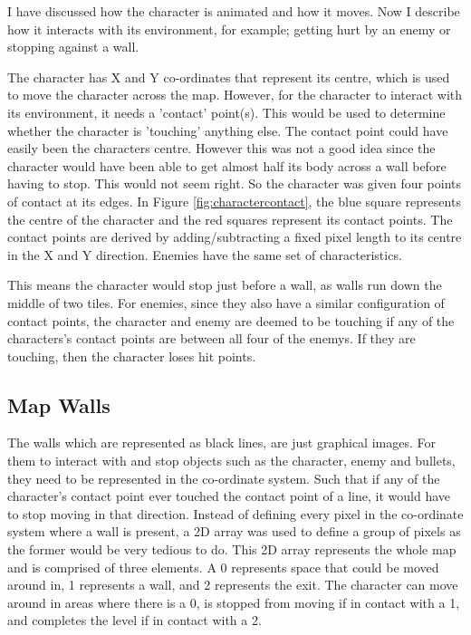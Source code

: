 \documentclass[a4paper,11.5pt]{report}
\numberwithin{figure}{section}
\numberwithin{table}{section}
\numberwithin{equation}{section}
\numberwithin{equation}{section}
\begin{document}
I have discussed how the character is animated and how it moves. Now I describe how it interacts with its environment, for example; getting hurt by an enemy or stopping against a wall.

The character has X and Y co-ordinates that represent its centre, which is used to move the character across the map. However, for the character to interact with its environment, it needs a 'contact' point(s). This would be used to determine whether the character is 'touching' anything else. The contact point could have easily been the characters centre. However this was not a good idea since the character would have been able to get almost half its body across a wall before having to stop. This would not seem right. So the character was given four points of contact at its edges. In Figure \ref{fig:charactercontact}, the blue square represents the centre of the character and the red squares represent its contact points. The contact points are derived by adding/subtracting a fixed pixel length to its centre in the X and Y direction. Enemies have the same set of characteristics.

This means the character would stop just before a wall, as walls run down the middle of two tiles. For enemies, since they also have a similar configuration of contact points, the character and enemy are deemed to be touching if any of the characters's contact points are between all four of the enemys. If they are touching, then the character loses hit points.


\subsection{Map Walls}

The walls which are represented as black lines, are just graphical images. For them to interact with and stop objects such as the character, enemy and bullets, they need to be represented in the co-ordinate system. Such that if any of the character's contact point ever touched the contact point of a line, it would have to stop moving in that direction. Instead of defining every pixel in the co-ordinate system where a wall is present, a 2D array was used to define a group of pixels as the former would be very tedious to do. This 2D array represents the whole map and is comprised of three elements. A 0 represents space that could be moved around in, 1 represents a wall, and 2 represents the exit. The character can move around in areas where there is a 0, is stopped from moving if in contact with a 1, and completes the level if in contact with a 2.
\end{document}
